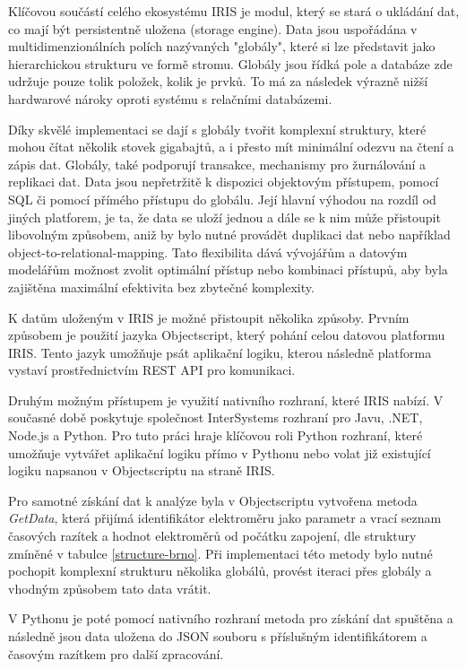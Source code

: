 \documentclass[FM,BP,fonts]{tulthesis}
\begin{document}
Klíčovou součástí celého ekosystému IRIS je modul, který se stará o ukládání dat, co mají být persistentně uložena (storage engine). Data jsou uspořádána v multidimenzionálních polích nazývaných "globály", které si lze představit jako hierarchickou strukturu ve formě stromu. Globály jsou řídká pole a databáze zde udržuje pouze tolik položek, kolik je prvků. To má za následek výrazně nižší hardwarové nároky oproti systému s relačními databázemi. 

Díky skvělé implementaci se dají s globály tvořit komplexní struktury, které mohou čítat několik stovek gigabajtů, a i přesto mít minimální odezvu na čtení a zápis dat. \cite{irisPlatform} Globály, také podporují transakce, mechanismy pro žurnálování a replikaci dat. Data jsou nepřetržitě k dispozici  objektovým přístupem, pomocí SQL či pomocí přímého přístupu do globálu. Její hlavní výhodou na rozdíl od jiných platforem, je ta, že data se uloží jednou a dále se k nim může přistoupit libovolným způsobem, aniž by bylo nutné provádět duplikaci dat nebo například object-to-relational-mapping. \cite{irisPlatform} Tato flexibilita dává vývojářům a datovým modelářům možnost zvolit optimální přístup nebo kombinaci přístupů, aby byla zajištěna maximální efektivita bez zbytečné komplexity.

K datům uloženým v IRIS je možné přistoupit několika způsoby. Prvním způsobem je použití jazyka Objectscript, který pohání celou datovou platformu IRIS. Tento jazyk umožňuje psát aplikační logiku, kterou následně platforma vystaví prostřednictvím REST API pro komunikaci.

Druhým možným přístupem je využití nativního rozhraní, které IRIS nabízí. V současné době poskytuje společnost InterSystems rozhraní pro Javu, .NET, Node.js a Python.\cite{irisPlatform} Pro tuto práci hraje klíčovou roli Python rozhraní, které umožňuje vytvářet aplikační logiku přímo v Pythonu nebo volat již existující logiku napsanou v Objectscriptu na straně IRIS.

Pro samotné získání dat k analýze byla v Objectscriptu vytvořena metoda \textit{GetData}, která přijímá identifikátor elektroměru jako parametr a vrací seznam časových razítek a hodnot elektroměrů od počátku zapojení, dle struktury zmíněné v tabulce \ref{structure-brno}. Při implementaci této metody bylo nutné pochopit komplexní strukturu několika globálů, provést iteraci přes globály a vhodným způsobem tato data vrátit. 

V Pythonu je poté pomocí nativního rozhraní metoda pro získání dat spuštěna a následně jsou data uložena do JSON souboru s příslušným identifikátorem a časovým razítkem pro další zpracování.  
\end{document}
